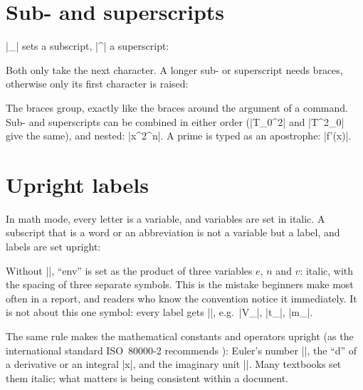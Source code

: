 \section{Sub- and superscripts}\label{sec:scripts}

\code|_| sets a subscript, \code|^| a superscript:


Both only take the next character.
A longer sub- or superscript needs braces, otherwise only its first character is raised:



The braces group, exactly like the braces around the argument of a command.
Sub- and superscripts can be combined in either order (\code|T_0^2| and \code|T^2_0| give the same),
and nested: \code|x^{2^n}|.
A prime is typed as an apostrophe: \code|f'(x)|.

\section{Upright labels}\label{sec:upright}

In math mode, every letter is a variable, and variables are set in italic.
A subscript that is a word or an abbreviation is not a variable but a label,
and labels are set upright:



Without \code|\mathrm|, \enquote{env} is set as the product of three variables $e$, $n$ and $v$:
italic, with the spacing of three separate symbols.
This is the mistake beginners make most often in a report,
and readers who know the convention notice it immediately.
It is not about this one symbol:
every label gets \code|\mathrm|, e.g.\
\code|V_{}|, \code|t_{}|, \code|m_{}|.

The same rule makes the mathematical constants and operators upright
(as the international standard ISO~80000-2 recommends \parencite{iso80000-2}):
Euler's number \code|\mathrm{e}|,
the \enquote{d} of a derivative or an integral \code|x|,
and the imaginary unit \code|\mathrm{i}|.
Many textbooks set them italic; what matters is being consistent within a document.

